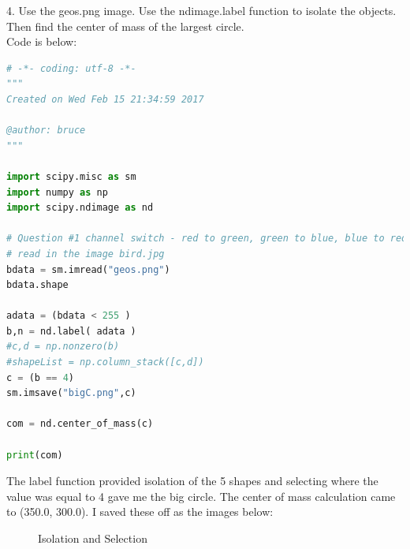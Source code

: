 \documentclass[12pt]{article}
\begin{document}
4.	Use the geos.png image. Use the ndimage.label function to isolate the objects. Then find the center of mass of the largest circle.\\
Code is below:
\begin{lstlisting}[language=Python]
# -*- coding: utf-8 -*-
"""
Created on Wed Feb 15 21:34:59 2017

@author: bruce
"""

import scipy.misc as sm
import numpy as np
import scipy.ndimage as nd

# Question #1 channel switch - red to green, green to blue, blue to red
# read in the image bird.jpg
bdata = sm.imread("geos.png")
bdata.shape

adata = (bdata < 255 )
b,n = nd.label( adata )
#c,d = np.nonzero(b)
#shapeList = np.column_stack([c,d])
c = (b == 4)
sm.imsave("bigC.png",c)

com = nd.center_of_mass(c)

print(com)
\end{lstlisting}

The label function provided isolation of the 5 shapes and selecting where the value was equal to 4 gave me the big circle.  The center of mass calculation came to (350.0, 300.0).  I saved these off as the images below:
\begin{figure}[ht!]%
    \centering
    \qquad
    \caption{Isolation and Selection}%
    \label{fig:example}%
\end{figure}
\end{document}
